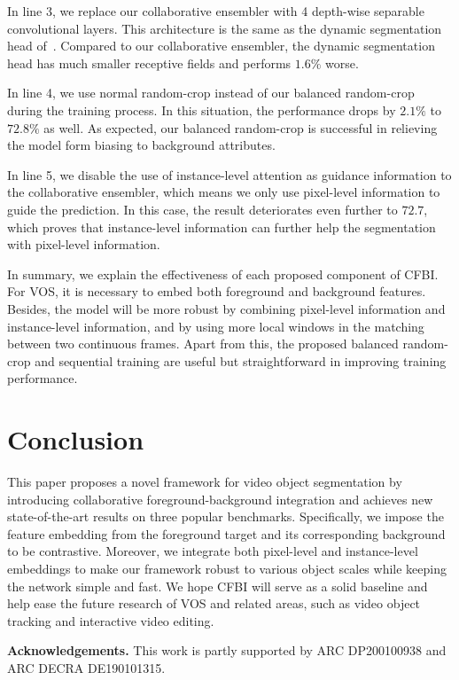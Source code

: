 \documentclass[runningheads]{llncs}
\begin{document}
In line 3, we replace our collaborative ensembler with 4 depth-wise separable convolutional layers. This architecture is the same as the dynamic segmentation head of~\cite{feelvos}. Compared to our collaborative ensembler, the dynamic segmentation head has much smaller receptive fields and performs $1.6\%$ worse.


In line 4, we use normal random-crop instead of our balanced random-crop during the training process. In this situation, the performance drops by $2.1\%$ to $72.8\%$ as well. As expected, our balanced random-crop is successful in relieving the model form biasing to background attributes.

In line 5, we disable the use of instance-level attention as guidance information to the collaborative ensembler, which means we only use pixel-level information to guide the prediction. In this case, the result deteriorates even further to $72.7$, which proves that instance-level information can further help the segmentation with pixel-level information.


In summary, we explain the effectiveness of each proposed component of CFBI. For VOS, it is necessary to embed both foreground and background features. Besides, the model will be more robust by combining pixel-level information and instance-level information, and by using more local windows in the matching between two continuous frames. Apart from this, the proposed balanced random-crop and sequential training are useful but straightforward in improving training performance. 



\section{Conclusion}

This paper proposes a novel framework for video object segmentation by introducing collaborative foreground-background integration and achieves new state-of-the-art results on three popular benchmarks. Specifically, we impose the feature embedding from the foreground target and its corresponding background to be contrastive. Moreover, we integrate both pixel-level and instance-level embeddings to make our framework robust to various object scales while keeping the network simple and fast. We hope CFBI will serve as a solid baseline and help ease the future research of VOS and related areas, such as video object tracking and interactive video editing.

\noindent \textbf{Acknowledgements.} This work is partly supported by ARC DP200100938 and ARC DECRA DE190101315.








\end{document}

